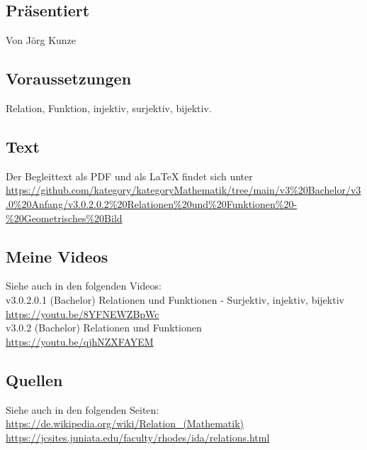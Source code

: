 \documentclass[a4paper]{amsart}
\theoremstyle{definition}
\begin{document}
\subsection*{Präsentiert}
Von Jörg Kunze

\subsection*{Voraussetzungen}
Relation, Funktion, injektiv, surjektiv, bijektiv.

\subsection*{Text}
Der Begleittext als PDF und als LaTeX findet sich unter
{\tiny
   \url{https://github.com/kategory/kategoryMathematik/tree/main/v3%20Bachelor/v3.0%20Anfang/v3.0.2.0.2%20Relationen%20und%20Funktionen%20-%20Geometrisches%20Bild}
}

\subsection*{Meine Videos}
Siehe auch in den folgenden Videos:\\
v3.0.2.0.1 (Bachelor) Relationen und Funktionen - Surjektiv, injektiv, bijektiv\\
\url{https://youtu.be/8YFNEWZBpWc}\\
v3.0.2 (Bachelor) Relationen und Funktionen\\
\url{https://youtu.be/qjhNZXFAYEM}

\subsection*{Quellen}
Siehe auch in den folgenden Seiten:\\
\url{https://de.wikipedia.org/wiki/Relation_(Mathematik)}\\
\url{https://jcsites.juniata.edu/faculty/rhodes/ida/relations.html}
\end{document}
